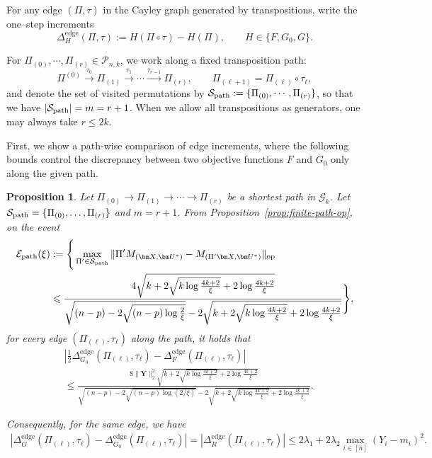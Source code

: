 \documentclass[11pt, reqno]{amsart}
\renewcommand{\le}{\leqslant}
\newcommand{\mP}{\mathcal{P}}
\newcommand{\mS}{\mathcal{S}}
\newcommand{\1}{\mbox{1}\hspace{-0.25em}\mbox{l}}
\theoremstyle{definition}\newtheorem{problem}{Problem}[section]
\theoremstyle{definition}\newtheorem{definition}[problem]{Definition}
\theoremstyle{remark}\newtheorem{assumption}{Assumption}
\theoremstyle{remark}\newtheorem{remark}[problem]{Remark}
\theoremstyle{definition}\newtheorem{example}[problem]{Example}
\theoremstyle{plain}\newtheorem{theorem}[problem]{Theorem}
\theoremstyle{plain}\newtheorem{question}[problem]{Question}
\theoremstyle{plain}\newtheorem{lemma}[problem]{Lemma}
\theoremstyle{plain}\newtheorem{proposition}[problem]{Proposition}
\theoremstyle{plain}\newtheorem{corollary}[problem]{Corollary}
\theoremstyle{plain}\newtheorem{conjecture}[problem]{Conjecture}
\begin{document}
For any edge $(\Pi,\tau)$ in the Cayley graph generated by transpositions, write the one–step increments
\[
\Delta_H^{\mathrm{edge}}(\Pi,\tau):=H(\Pi\circ\tau)-H(\Pi), \qquad H\in\{F,G_0,G\}.
\]

For $\Pi_{(0)},\cdots, \Pi_{(r)}\in\mP_{n,k}$, we work along a fixed transposition path:
\[
\Pi^{(0)}\xrightarrow{\tau_0}\Pi_{(1)}\xrightarrow{\tau_1}\cdots
\xrightarrow{\tau_{r-1}}\Pi_{(r)},
\qquad \Pi_{(\ell+1)}=\Pi_{(\ell)} \circ \tau_\ell,
\]
and denote the set of visited permutations by $\mS_{\rm path}:=\{\Pi_{(0)},\cdots,\Pi_{(r)}\}$, so that we have $|\mS_{\rm path}|=m=r+1$. When we allow all transpositions as generators, one may always take $r\le 2k$.

First, we show a path-wise comparison of edge increments, where the following bounds control the discrepancy between two objective functions $F$ and $G_0$ only along the given path.

\begin{proposition}\label{prop:edge-compare-path}
Let $\Pi_{(0)}\to\Pi_{(1)}\to\cdots\to\Pi_{(r)}$ be a shortest path in $\mathcal{G}_k$.
Let $\mS_{\rm path} = \{\Pi_{(0)},\ldots,\Pi_{(r)}\}$ and $m=r+1$.
From Proposition~\ref{prop:finite-path-op}, on the event
\begin{align*}
\mathcal{E}_{\rm path}(\xi)
&:= \Bigg\{
\max_{\Pi'\in\mS_{\rm path}}
\|\Pi' M_{(\bm X,\bm U^*)}-M_{(\Pi'\bm X,\bm U^*)}\|_{\rm op}\\
&\le 
\frac{4\sqrt{k+2\sqrt{k\log\frac{4k+2}{\xi}}+2\log\frac{4k+2}{\xi}}}
{\sqrt{(n-p)-2\sqrt{(n-p)\log \frac{2}{\xi}}}-2\sqrt{k+2\sqrt{k\log \frac{4k+2}{\xi}}+2\log \frac{4k+2}{\xi}}}
\Bigg\},
\end{align*}
for every edge $(\Pi_{(\ell)},\tau_\ell)$ along the path, it holds that
\begin{align*}
&\left|\frac{1}{2} \Delta_{G_0}^{\mathrm{edge}}(\Pi_{(\ell)},\tau_\ell)-\Delta_F^{\mathrm{edge}}(\Pi_{(\ell)},\tau_\ell)\right|\\
&\le  
\frac{8 \|\bm Y\|_2^2 \sqrt{k+2\sqrt{k\log\frac{4k+2}{\xi}}+2\log\frac{4k+2}{\xi}}}
{\sqrt{ (n-p)-2\sqrt{(n-p)\log(2/\xi)}}-2\sqrt{k+2\sqrt{k\log\frac{4k+2}{\xi}}+2\log\frac{4k+2}{\xi}}}.
\end{align*}

Consequently, for the same edge, we have
\begin{align*}
    \left| \Delta_G^{\mathrm{edge}}(\Pi_{(\ell)},\tau_\ell)-\Delta_{G_0}^{\mathrm{edge}}(\Pi_{(\ell)},\tau_\ell)\right|
    =\left|\Delta_R^{\mathrm{edge}}(\Pi_{(\ell)},\tau_\ell)\right|
    \le 2\lambda_1+2\lambda_2\max_{i\in[n]} (Y_i-m_i)^2.
\end{align*}
\end{proposition}
\end{document}
